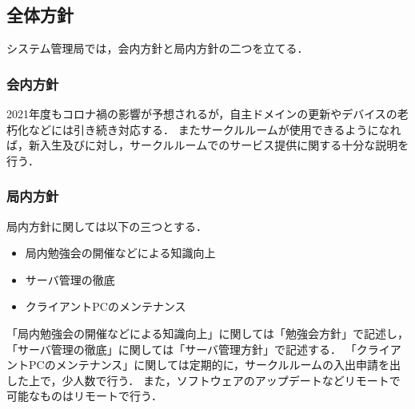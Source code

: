 \subsection*{全体方針}

システム管理局では，会内方針と局内方針の二つを立てる．

\subsubsection*{会内方針}
2021年度もコロナ禍の影響が予想されるが，自主ドメインの更新やデバイスの老朽化などには引き続き対応する．
またサークルルームが使用できるようになれば，新入生及び\secondGrade{}に対し，サークルルームでのサービス提供に関する十分な説明を行う．

\subsubsection*{局内方針}
局内方針に関しては以下の三つとする．
\begin{itemize}
  \item 局内勉強会の開催などによる知識向上
  \item サーバ管理の徹底
  \item クライアントPCのメンテナンス
\end{itemize}
「局内勉強会の開催などによる知識向上」に関しては「勉強会方針」で記述し，
「サーバ管理の徹底」に関しては「サーバ管理方針」で記述する．
「クライアントPCのメンテナンス」に関しては定期的に，サークルルームの入出申請を出した上で，少人数で行う．
また，ソフトウェアのアップデートなどリモートで可能なものはリモートで行う．
